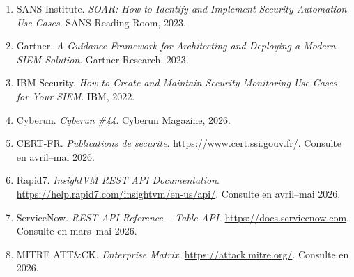 \documentclass{rapport}
\begin{document}
\begin{enumerate}
  \item SANS Institute. \textit{SOAR: How to Identify and Implement Security
        Automation Use Cases}. SANS Reading Room, 2023.
  \item Gartner. \textit{A Guidance Framework for Architecting and Deploying
        a Modern SIEM Solution}. Gartner Research, 2023.
  \item IBM Security. \textit{How to Create and Maintain Security Monitoring
        Use Cases for Your SIEM}. IBM, 2022.
  \item Cyberun. \textit{Cyberun \#44}. Cyberun Magazine, 2026.
  \item CERT-FR. \textit{Publications de securite}.
        \url{https://www.cert.ssi.gouv.fr/}. Consulte en avril--mai 2026.
  \item Rapid7. \textit{InsightVM REST API Documentation}.
        \url{https://help.rapid7.com/insightvm/en-us/api/}.
        Consulte en avril--mai 2026.
  \item ServiceNow. \textit{REST API Reference -- Table API}.
        \url{https://docs.servicenow.com}. Consulte en mars--mai 2026.
  \item MITRE ATT\&CK. \textit{Enterprise Matrix}.
        \url{https://attack.mitre.org/}. Consulte en 2026.
\end{enumerate}
\end{document}

